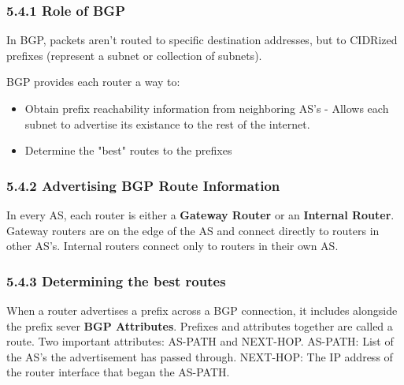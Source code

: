 \documentclass[11pt]{article}
\begin{document}
\subsubsection{5.4.1 Role of BGP}
\label{sec:org64c27cc}
In BGP, packets aren't routed to specific destination addresses, but to CIDRized prefixes (represent a subnet or collection of subnets).

BGP provides each router a way to:
\begin{itemize}
\item Obtain prefix reachability information from neighboring AS's - Allows each subnet to advertise its existance to the rest of the internet.
\item Determine the "best" routes to the prefixes
\end{itemize}

\subsubsection{5.4.2 Advertising BGP Route Information}
\label{sec:orgd7f776c}
In every AS, each router is either a \textbf{Gateway Router} or an \textbf{Internal Router}.
Gateway routers are on the edge of the AS and connect directly to routers in other AS's.
Internal routers connect only to routers in their own AS. 

\subsubsection{5.4.3 Determining the best routes}
\label{sec:orgfab9cc0}
When a router advertises a prefix across a BGP connection, it includes alongside the prefix sever \textbf{BGP Attributes}. Prefixes and attributes together are called a route.
Two important attributes: AS-PATH and NEXT-HOP.
AS-PATH: List of the AS's the advertisement has passed through.
NEXT-HOP: The IP address of the router interface that began the AS-PATH. 
\end{document}
